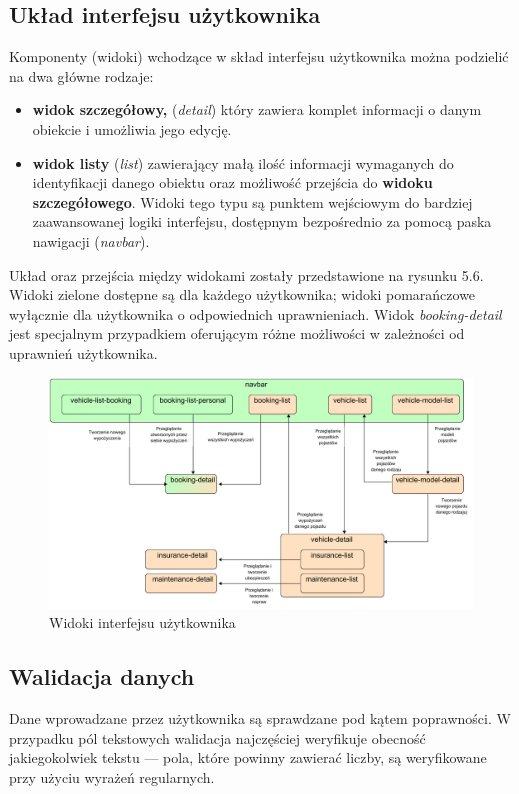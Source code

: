 \documentclass[eng,printmode,openany]{mgr}
\begin{document}
	\subsection{Układ interfejsu użytkownika}
	Komponenty (widoki) wchodzące w skład interfejsu użytkownika można podzielić na dwa główne rodzaje:
	\begin{itemize}
		\item \textbf{widok szczegółowy,} (\textit{detail}) który zawiera komplet informacji o danym obiekcie i umożliwia jego edycję.
		\item \textbf{widok listy} (\textit{list}) zawierający małą ilość informacji wymaganych do identyfikacji danego obiektu oraz możliwość przejścia do \textbf{widoku szczegółowego}. Widoki tego typu są punktem wejściowym do bardziej zaawansowanej logiki interfejsu, dostępnym bezpośrednio za pomocą paska nawigacji (\textit{navbar}).
	\end{itemize}

	Układ oraz przejścia między widokami zostały przedstawione na rysunku 5.6. Widoki zielone dostępne są dla każdego użytkownika; widoki pomarańczowe wyłącznie dla użytkownika o odpowiednich uprawnieniach. Widok \textit{booking-detail} jest specjalnym przypadkiem oferującym różne możliwości w zależności od uprawnień użytkownika.
	
	\begin{figure}[H]
		\centering
		\includegraphics[width=\textwidth]{images/angular_views.png}
		\caption{Widoki interfejsu użytkownika}
	\end{figure}

	\subsection{Walidacja danych}
	Dane wprowadzane przez użytkownika są sprawdzane pod kątem poprawności. W przypadku pól tekstowych walidacja najczęściej weryfikuje obecność jakiegokolwiek tekstu — pola, które powinny zawierać liczby, są weryfikowane przy użyciu wyrażeń regularnych.
	
\end{document}
